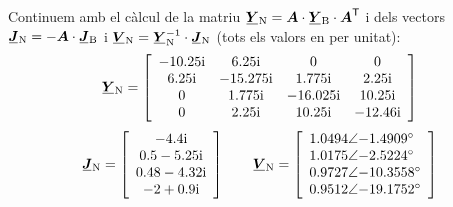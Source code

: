 \begin{exemple}
    Continuem amb el càlcul de la matriu $\mcmplx{Y}\ped{N} =
    \boldsymbol{A} \cdot \mcmplx{Y}\ped{B} \cdot \transpose{\boldsymbol{A}}$ i dels
    vectors $\mcmplx{J}\ped{N} = - \boldsymbol{A} \cdot \mcmplx{J}\ped{B}$ i
    $\mcmplx{V}\ped{N} = \mcmplx{Y}\ped{N}^{-1} \cdot \mcmplx{J}\ped{N}$ (tots
    els valors en per unitat):
    \[
       \mcmplx{Y}\ped{N} =
       \begin{bmatrix}\begin{array}{cccc}
         \complexnum{-j 10,25} & \complexnum{j 6,25} & 0 & 0 \\
         \complexnum{j 6,25} & \complexnum{-j 15,275} & \complexnum{j 1,775} & \complexnum{j 2,25} \\
         0 & \complexnum{j 1,775 }& \complexnum{-j 16,025} & \complexnum{j 10,25} \\
         0 & \complexnum{j 2,25} & \complexnum{j 10,25} & \complexnum{-j 12,46}
       \end{array}\end{bmatrix}
    \]
    \qquad
    \[
       \mcmplx{J}\ped{N} =
       \begin{bmatrix}\begin{array}{c}
        \complexnum{-j 4,4} \\
        \complexnum{0,5 - j 5,25} \\
       \complexnum{ 0,48 - j 4,32} \\
        \complexnum{-2 + j 0,9}
       \end{array}\end{bmatrix}
       \qquad
       \mcmplx{V}\ped{N} =
       \begin{bmatrix}\begin{array}{l}
        \complexnum{1,0494:-1,4909} \\
        \complexnum{1,0175:-2,5224} \\
        \complexnum{0,9727:-10,3558} \\
        \complexnum{0,9512:-19,1752}
       \end{array}\end{bmatrix}
    \]


\end{exemple}
